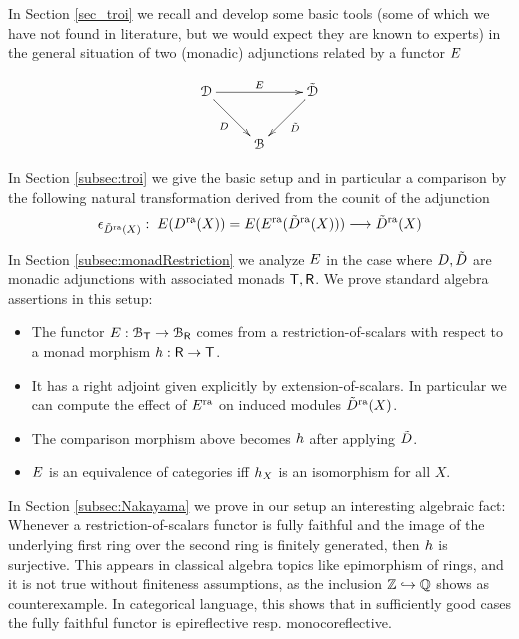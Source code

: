 \documentclass[a4paper, reqno]{amsart}
\theoremstyle{introTheorems}
\renewcommand{\1}{\mathbbold{1}}
\begin{document}
In Section \ref{sec_troi} we recall and develop some basic tools (some of which we have not found in literature, but we would expect they are known to experts) in the general situation of two (monadic) adjunctions related by a functor $E$

\begin{equation*}
\xymatrix{
\catD 
\ar[rr]^{\funE}
\ar[rd]_{\funD}
&&
\catDD
\ar[ld]^{\funDD}
\\
&
\catB
&
\\
} 
\end{equation*}

In Section \ref{subsec:troi} we give the basic setup and in particular a comparison by the following natural transformation derived from the counit of the adjunction
\[\epsilon_{\tilde{D}^{\mathrm{ra}}(X)}:\;E(D^{\mathrm{ra}}(X))=E(E^{\mathrm{ra}}(\tilde{D}^{\mathrm{ra}}(X)))
\longrightarrow \tilde{D}^{\mathrm{ra}}(X)\]


In Section \ref{subsec:monadRestriction} we analyze $E$ in the case where $D,\tilde{D}$ are monadic adjunctions with associated monads ${\mathsf{T}},{\mathsf{R}}$. We prove standard algebra assertions in this setup:
\begin{itemize}
    \item The functor $E:\mathcal{B}_{\mathsf{T}}\to \mathcal{B}_{\mathsf{R}}$ comes from a restriction-of-scalars with respect to a monad morphism $h:{\mathsf{R}}\to {\mathsf{T}}$.
    \item It has a right adjoint given explicitly by extension-of-scalars. In particular we can compute the effect of $E^{\mathrm{ra}}$ on induced modules $\tilde{D}^{\mathrm{ra}}(X)$.
    \item The comparison morphism above becomes $h$ after applying $\tilde{D}$.
    \item $E$ is an equivalence of categories iff $h_X$ is an isomorphism for all $X$. 
\end{itemize}

In Section \ref{subsec:Nakayama} we prove in our setup an interesting algebraic fact: Whenever a restriction-of-scalars functor is fully faithful and the image of the underlying first ring over the second ring is finitely generated, then $h$ is surjective. This appears in classical algebra topics like epimorphism of rings, and it is not true without finiteness assumptions, as the inclusion $\mathbb{Z}\hookrightarrow\mathbb{Q}$ shows as counterexample. In categorical language, this shows that in sufficiently good cases the fully faithful functor is epireflective resp. monocoreflective. 

\bigskip
\end{document}
